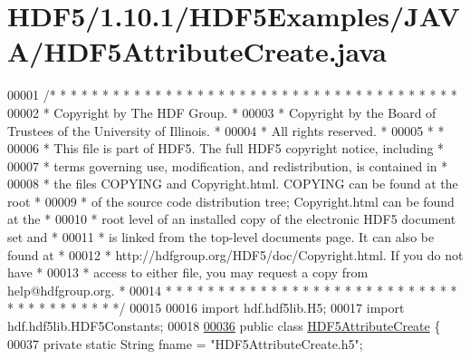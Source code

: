 \hypertarget{_h_d_f5_21_810_81_2_h_d_f5_examples_2_j_a_v_a_2_h_d_f5_attribute_create_8java_source}{}\section{H\+D\+F5/1.10.1/\+H\+D\+F5\+Examples/\+J\+A\+V\+A/\+H\+D\+F5\+Attribute\+Create.java}
\label{_h_d_f5_21_810_81_2_h_d_f5_examples_2_j_a_v_a_2_h_d_f5_attribute_create_8java_source}

\begin{DoxyCode}
00001 \textcolor{comment}{/* * * * * * * * * * * * * * * * * * * * * * * * * * * * * * * * * * * * * * *}
00002 \textcolor{comment}{ * Copyright by The HDF Group.                                               *}
00003 \textcolor{comment}{ * Copyright by the Board of Trustees of the University of Illinois.         *}
00004 \textcolor{comment}{ * All rights reserved.                                                      *}
00005 \textcolor{comment}{ *                                                                           *}
00006 \textcolor{comment}{ * This file is part of HDF5.  The full HDF5 copyright notice, including     *}
00007 \textcolor{comment}{ * terms governing use, modification, and redistribution, is contained in    *}
00008 \textcolor{comment}{ * the files COPYING and Copyright.html.  COPYING can be found at the root   *}
00009 \textcolor{comment}{ * of the source code distribution tree; Copyright.html can be found at the  *}
00010 \textcolor{comment}{ * root level of an installed copy of the electronic HDF5 document set and   *}
00011 \textcolor{comment}{ * is linked from the top-level documents page.  It can also be found at     *}
00012 \textcolor{comment}{ * http://hdfgroup.org/HDF5/doc/Copyright.html.  If you do not have          *}
00013 \textcolor{comment}{ * access to either file, you may request a copy from help@hdfgroup.org.     *}
00014 \textcolor{comment}{ * * * * * * * * * * * * * * * * * * * * * * * * * * * * * * * * * * * * * * */}
00015 
00016 \textcolor{keyword}{import} hdf.hdf5lib.H5;
00017 \textcolor{keyword}{import} hdf.hdf5lib.HDF5Constants;
00018 
\hyperlink{class_h_d_f5_attribute_create}{00036} \textcolor{keyword}{public} \textcolor{keyword}{class }\hyperlink{class_h_d_f5_attribute_create}{HDF5AttributeCreate} \{
00037     \textcolor{keyword}{private} \textcolor{keyword}{static} String fname  = \textcolor{stringliteral}{"HDF5AttributeCreate.h5"};

\end{DoxyCode}
